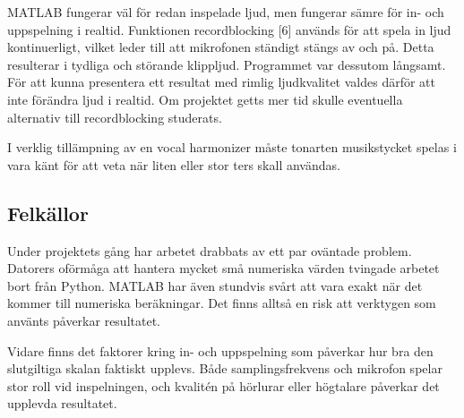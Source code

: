 \documentclass[12pt,a4paper]{article}
\begin{document}
MATLAB fungerar väl för redan inspelade ljud, men fungerar sämre för in- och uppspelning i realtid. Funktionen recordblocking [6] används för att spela in ljud kontinuerligt, vilket leder till att mikrofonen ständigt stängs av och på. Detta resulterar i tydliga och störande klippljud. Programmet var dessutom långsamt. För att kunna presentera ett resultat med rimlig ljudkvalitet valdes därför att inte förändra ljud i realtid. Om projektet getts mer tid skulle eventuella alternativ till recordblocking studerats.

I verklig tillämpning av en vocal harmonizer måste tonarten musikstycket spelas i vara känt för att veta när liten eller stor ters skall användas.

\subsection{Felkällor}

Under projektets gång har arbetet drabbats av ett par oväntade problem. Datorers oförmåga att hantera mycket små numeriska värden tvingade arbetet bort från Python. MATLAB har även stundvis svårt att vara exakt när det kommer till numeriska beräkningar. Det finns alltså en risk att verktygen som använts påverkar resultatet.

Vidare finns det faktorer kring in- och uppspelning som påverkar hur bra den slutgiltiga skalan faktiskt upplevs. Både samplingsfrekvens och mikrofon spelar stor roll vid inspelningen, och kvalitén på hörlurar eller högtalare påverkar det upplevda resultatet.
\end{document}
